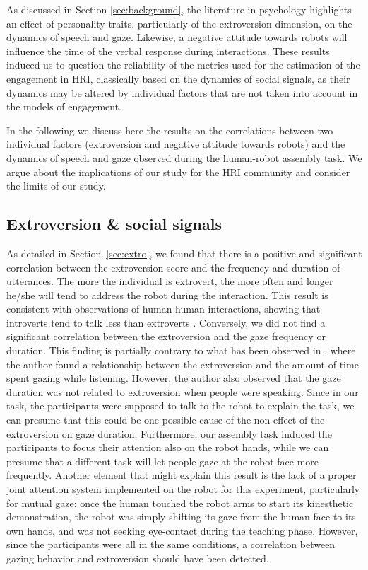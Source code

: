 \documentclass[twocolumn]{svjour3}          %
\newcommand{\todo}[1]{\color{red} { \bf TODO: #1 } \normalcolor}
\begin{document}


As discussed in Section \ref{sec:background}, the literature in psychology highlights an effect of personality traits, particularly of the extroversion dimension, on the dynamics of speech and gaze. Likewise, a negative attitude towards robots will influence the time of the verbal response during interactions.
These results induced us to question the reliability of the metrics used for the estimation of the engagement in HRI, classically based on the dynamics of social signals, as their dynamics may be altered by individual factors that are not taken into account in the models of engagement.

In the following we discuss here the results on the correlations between two individual factors (extroversion and negative attitude towards robots) and the dynamics of speech and gaze observed during the human-robot assembly task. We argue about the implications of our study for the HRI community and consider the limits of our study. 


\subsection{Extroversion \& social signals}
As detailed in Section~\ref{sec:extro}, we found that there is a positive and significant correlation between the extroversion score and the frequency and duration of utterances.
The more the individual is extrovert, the more often and longer he/she will tend to address the robot during the interaction. 
This result is consistent with observations of human-human interactions, showing that introverts tend to talk less than extroverts \cite{Scherer1981}. 
Conversely, we did not find a significant correlation between the extroversion and the gaze frequency or duration. This finding is partially contrary to what has been observed in \cite{Iizuka1992}, where the author found a relationship between the extroversion and the amount of time spent gazing while listening. However, the author also observed that the gaze duration was not related to extroversion when people were speaking. Since in our task, the participants were supposed to talk to the robot to explain the task, we can presume that this could be one possible cause of the non-effect of the extroversion on gaze duration. Furthermore, our assembly task induced the participants to focus their attention also on the robot hands, while we can presume that a different task will let people gaze at the robot face more frequently.
Another element that might explain this result is the lack of a proper joint attention system implemented on the robot for this experiment, particularly for mutual gaze: once the human touched the robot arms to start its kinesthetic demonstration, the robot was simply shifting its gaze from the human face to its own hands, and was not seeking eye-contact during the teaching phase.
However, since the participants were all in the same conditions, a correlation between gazing behavior and extroversion should have been detected.
\end{document}
